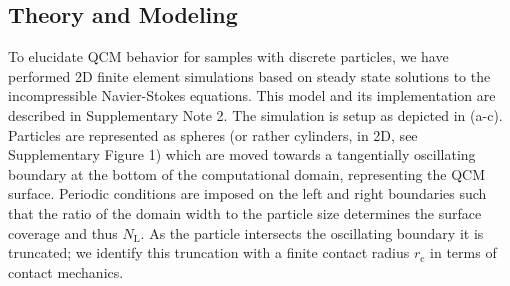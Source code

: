 \subsection*{Theory and Modeling}
\label{sec:theoryandmodeling}
To elucidate QCM behavior for samples with discrete particles, we have
performed 2D finite element simulations based on steady state solutions to
the incompressible Navier-Stokes equations.  This model and its
implementation are described in Supplementary Note 2.  The
simulation is setup as depicted in \mbox{(a-c)}.  Particles
are represented as spheres (or rather cylinders, in 2D, see Supplementary
Figure 1) which are moved
towards a tangentially oscillating boundary at the bottom of the
computational domain, representing the QCM surface.  Periodic conditions
are imposed on the left and right boundaries such that the ratio of the
domain width to the particle size determines the surface coverage and thus
$N_\mathrm{L}$.  As the particle intersects the oscillating boundary it is
truncated; we identify this truncation with a finite contact radius
$r_\mathrm{c}$ in terms of contact mechanics.
